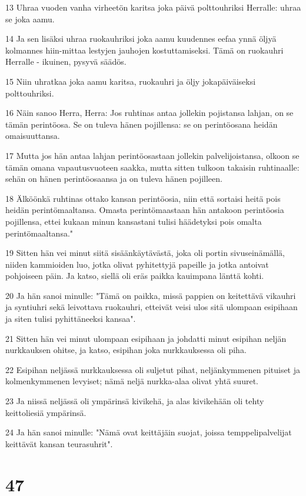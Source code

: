 \par 13 Uhraa vuoden vanha virheetön karitsa joka päivä polttouhriksi Herralle: uhraa se joka aamu.
\par 14 Ja sen lisäksi uhraa ruokauhriksi joka aamu kuudennes eefaa ynnä öljyä kolmannes hiin-mittaa lestyjen jauhojen kostuttamiseksi. Tämä on ruokauhri Herralle - ikuinen, pysyvä säädös.
\par 15 Niin uhratkaa joka aamu karitsa, ruokauhri ja öljy jokapäiväiseksi polttouhriksi.
\par 16 Näin sanoo Herra, Herra: Jos ruhtinas antaa jollekin pojistansa lahjan, on se tämän perintöosa. Se on tuleva hänen pojillensa: se on perintöosana heidän omaisuuttansa.
\par 17 Mutta jos hän antaa lahjan perintöosastaan jollekin palvelijoistansa, olkoon se tämän omana vapautusvuoteen saakka, mutta sitten tulkoon takaisin ruhtinaalle: sehän on hänen perintöosaansa ja on tuleva hänen pojilleen.
\par 18 Älköönkä ruhtinas ottako kansan perintöosia, niin että sortaisi heitä pois heidän perintömaaltansa. Omasta perintömaastaan hän antakoon perintöosia pojillensa, ettei kukaan minun kansastani tulisi häädetyksi pois omalta perintömaaltansa."
\par 19 Sitten hän vei minut siitä sisäänkäytävästä, joka oli portin sivuseinämällä, niiden kammioiden luo, jotka olivat pyhitettyjä papeille ja jotka antoivat pohjoiseen päin. Ja katso, siellä oli eräs paikka kauimpana länttä kohti.
\par 20 Ja hän sanoi minulle: "Tämä on paikka, missä pappien on keitettävä vikauhri ja syntiuhri sekä leivottava ruokauhri, etteivät veisi ulos sitä ulompaan esipihaan ja siten tulisi pyhittäneeksi kansaa".
\par 21 Sitten hän vei minut ulompaan esipihaan ja johdatti minut esipihan neljän nurkkauksen ohitse, ja katso, esipihan joka nurkkauksessa oli piha.
\par 22 Esipihan neljässä nurkkauksessa oli suljetut pihat, neljänkymmenen pituiset ja kolmenkymmenen levyiset; nämä neljä nurkka-alaa olivat yhtä suuret.
\par 23 Ja niissä neljässä oli ympärinsä kivikehä, ja alas kivikehään oli tehty keittoliesiä ympärinsä.
\par 24 Ja hän sanoi minulle: "Nämä ovat keittäjäin suojat, joissa temppelipalvelijat keittävät kansan teurasuhrit".

\chapter{47}

